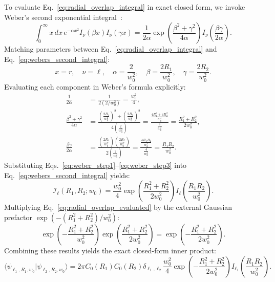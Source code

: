 \documentclass[11pt,a4paper]{article}
\begin{document}
To evaluate Eq.~\eqref{eq:radial_overlap_integral} in exact closed form, we invoke Weber's second exponential integral~\cite{Gradshteyn2014}:
\begin{equation}
\int_0^\infty x \, dx \, e^{-\alpha x^2} I_\nu(\beta x) I_\nu(\gamma x) = \frac{1}{2\alpha} \exp\left( \frac{\beta^2 + \gamma^2}{4\alpha} \right) I_\nu\left( \frac{\beta \gamma}{2\alpha} \right).
\label{eq:webers_second_integral}
\end{equation}
Matching parameters between Eq.~\eqref{eq:radial_overlap_integral} and Eq.~\eqref{eq:webers_second_integral}:
\begin{equation}
x = r, \quad \nu = \ell, \quad \alpha = \frac{2}{w_0^2}, \quad \beta = \frac{2 R_1}{w_0^2}, \quad \gamma = \frac{2 R_2}{w_0^2}.
\label{eq:weber_parameter_identification}
\end{equation}
Evaluating each component in Weber's formula explicitly:
\begin{align}
\frac{1}{2\alpha} &= \frac{1}{2(2 / w_0^2)} = \frac{w_0^2}{4}, \label{eq:weber_step1} \\
\frac{\beta^2 + \gamma^2}{4\alpha} &= \frac{\left( \frac{2 R_1}{w_0^2} \right)^2 + \left( \frac{2 R_2}{w_0^2} \right)^2}{4\left( \frac{2}{w_0^2} \right)} = \frac{\frac{4 R_1^2 + 4 R_2^2}{w_0^4}}{\frac{8}{w_0^2}} = \frac{R_1^2 + R_2^2}{2 w_0^2}, \label{eq:weber_step2} \\
\frac{\beta \gamma}{2\alpha} &= \frac{\left( \frac{2 R_1}{w_0^2} \right) \left( \frac{2 R_2}{w_0^2} \right)}{2\left( \frac{2}{w_0^2} \right)} = \frac{\frac{4 R_1 R_2}{w_0^4}}{\frac{4}{w_0^2}} = \frac{R_1 R_2}{w_0^2}. \label{eq:weber_step3}
\end{align}
Substituting Eqs.~\eqref{eq:weber_step1}--\eqref{eq:weber_step3} into Eq.~\eqref{eq:webers_second_integral} yields:
\begin{equation}
\mathcal{I}_\ell(R_1, R_2; w_0) = \frac{w_0^2}{4} \exp\left( \frac{R_1^2 + R_2^2}{2 w_0^2} \right) I_\ell\left( \frac{R_1 R_2}{w_0^2} \right).
\label{eq:radial_overlap_evaluated}
\end{equation}
Multiplying Eq.~\eqref{eq:radial_overlap_evaluated} by the external Gaussian prefactor $\exp(-(R_1^2 + R_2^2) / w_0^2)$:
\begin{equation}
\exp\left( - \frac{R_1^2 + R_2^2}{w_0^2} \right) \exp\left( \frac{R_1^2 + R_2^2}{2 w_0^2} \right) = \exp\left( - \frac{R_1^2 + R_2^2}{2 w_0^2} \right).
\label{eq:prefactor_multiplication}
\end{equation}
Combining these results yields the exact closed-form inner product:
\begin{equation}
\boxed{\langle \psi_{\ell_1, R_1, w_0} | \psi_{\ell_2, R_2, w_0} \rangle = 2\pi C_0(R_1) C_0(R_2) \delta_{\ell_1, \ell_2} \frac{w_0^2}{4} \exp\left( - \frac{R_1^2 + R_2^2}{2 w_0^2} \right) I_{\ell_1}\left( \frac{R_1 R_2}{w_0^2} \right).}
\label{eq:exact_inner_product}
\end{equation}
\end{document}
